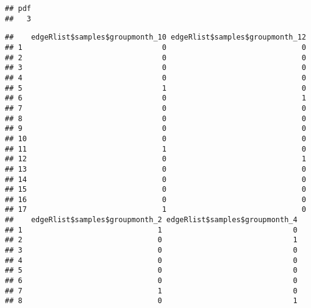 \documentclass[]{article}
\newenvironment{Shaded}{\begin{snugshade}}{\end{snugshade}}
\newcommand{\CommentTok}[1]{\textcolor[rgb]{0.56,0.35,0.01}{\textit{#1}}}
\newcommand{\DecValTok}[1]{\textcolor[rgb]{0.00,0.00,0.81}{#1}}
\newcommand{\KeywordTok}[1]{\textcolor[rgb]{0.13,0.29,0.53}{\textbf{#1}}}
\newcommand{\NormalTok}[1]{#1}
\newcommand{\OperatorTok}[1]{\textcolor[rgb]{0.81,0.36,0.00}{\textbf{#1}}}
\newcommand{\StringTok}[1]{\textcolor[rgb]{0.31,0.60,0.02}{#1}}
\begin{document}
\begin{verbatim}
## pdf 
##   3
\end{verbatim}

\begin{Shaded}
\end{Shaded}

\begin{verbatim}
##    edgeRlist$samples$groupmonth_10 edgeRlist$samples$groupmonth_12
## 1                                0                               0
## 2                                0                               0
## 3                                0                               0
## 4                                0                               0
## 5                                1                               0
## 6                                0                               1
## 7                                0                               0
## 8                                0                               0
## 9                                0                               0
## 10                               0                               0
## 11                               1                               0
## 12                               0                               1
## 13                               0                               0
## 14                               0                               0
## 15                               0                               0
## 16                               0                               0
## 17                               1                               0
##    edgeRlist$samples$groupmonth_2 edgeRlist$samples$groupmonth_4
## 1                               1                              0
## 2                               0                              1
## 3                               0                              0
## 4                               0                              0
## 5                               0                              0
## 6                               0                              0
## 7                               1                              0
## 8                               0                              1

\end{verbatim}
\end{document}
